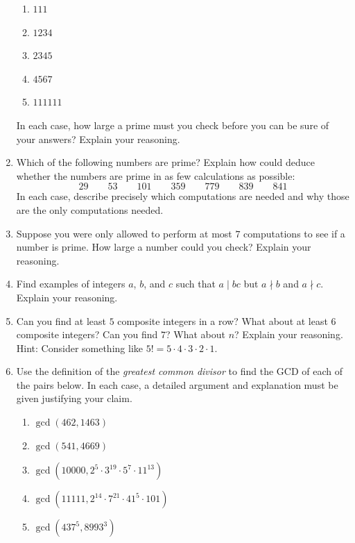 \begin{problems}
\begin{enumerate}
\begin{enumerate}
\item $111$
\item $1234$
\item $2345$
\item $4567$
\item $111111$
\end{enumerate}
In each case, how large a prime must you check before you can be sure
of your answers? Explain your reasoning.
\item Which of the following numbers are prime?  Explain how could deduce whether the numbers are prime in
  as few calculations as possible:
\[
29 \qquad 53 \qquad 101 \qquad 359 \qquad 779 \qquad 839 \qquad 841
\]
In each case, describe precisely which computations are needed and
why those are the only computations needed.
\item Suppose you were only allowed to perform at most $7$
  computations to see if a number is prime. How large a number could
  you check?  Explain your reasoning.
\item Find examples of integers $a$, $b$, and $c$ such that $a \mid
  bc$ but $a\nmid b$ and $a\nmid c$. Explain your reasoning.
\item Can you find at least $5$ composite integers in a row? What
  about at least $6$ composite integers? Can you find $7$?
  What about $n$?  Explain your reasoning. Hint: Consider something
  like $5! = 5\cdot 4 \cdot 3 \cdot 2 \cdot 1$.
\item Use the definition of the \textit{greatest common divisor} to
  find the GCD of each of the pairs below. In each
  case, a detailed argument and explanation must be given justifying
  your claim.
\begin{enumerate}
\item $\gcd(462,1463)$
\item $\gcd(541,4669)$ 
\item $\gcd(10000,2^5\cdot 3^{19}\cdot 5^7\cdot 11^{13})$
\item $\gcd(11111,2^{14}\cdot 7^{21}\cdot 41^{5}\cdot 101)$
\item $\gcd(437^5,8993^3)$
\end{enumerate}


\end{enumerate}
\end{problems}
